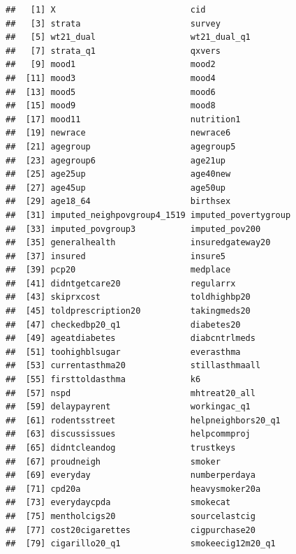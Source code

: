 \documentclass[
]{article}
\begin{document}
\begin{verbatim}
##   [1] X                           cid                        
##   [3] strata                      survey                     
##   [5] wt21_dual                   wt21_dual_q1               
##   [7] strata_q1                   qxvers                     
##   [9] mood1                       mood2                      
##  [11] mood3                       mood4                      
##  [13] mood5                       mood6                      
##  [15] mood9                       mood8                      
##  [17] mood11                      nutrition1                 
##  [19] newrace                     newrace6                   
##  [21] agegroup                    agegroup5                  
##  [23] agegroup6                   age21up                    
##  [25] age25up                     age40new                   
##  [27] age45up                     age50up                    
##  [29] age18_64                    birthsex                   
##  [31] imputed_neighpovgroup4_1519 imputed_povertygroup       
##  [33] imputed_povgroup3           imputed_pov200             
##  [35] generalhealth               insuredgateway20           
##  [37] insured                     insure5                    
##  [39] pcp20                       medplace                   
##  [41] didntgetcare20              regularrx                  
##  [43] skiprxcost                  toldhighbp20               
##  [45] toldprescription20          takingmeds20               
##  [47] checkedbp20_q1              diabetes20                 
##  [49] ageatdiabetes               diabcntrlmeds              
##  [51] toohighblsugar              everasthma                 
##  [53] currentasthma20             stillasthmaall             
##  [55] firsttoldasthma             k6                         
##  [57] nspd                        mhtreat20_all              
##  [59] delaypayrent                workingac_q1               
##  [61] rodentsstreet               helpneighbors20_q1         
##  [63] discussissues               helpcommproj               
##  [65] didntcleandog               trustkeys                  
##  [67] proudneigh                  smoker                     
##  [69] everyday                    numberperdaya              
##  [71] cpd20a                      heavysmoker20a             
##  [73] everydaycpda                smokecat                   
##  [75] mentholcigs20               sourcelastcig              
##  [77] cost20cigarettes            cigpurchase20              
##  [79] cigarillo20_q1              smokeecig12m20_q1          

\end{verbatim}
\end{document}
